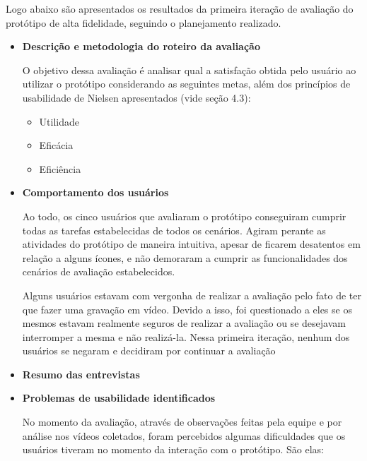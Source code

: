      Logo abaixo são apresentados os resultados da primeira iteração de avaliação do protótipo de alta fidelidade,
      seguindo o planejamento realizado.
      
      \begin{itemize}
       \item \textbf{Descrição e metodologia do roteiro da avaliação}
       
       \subitem O objetivo dessa avaliação é analisar qual a satisfação obtida pelo usuário ao utilizar o protótipo 
        considerando as seguintes metas, além dos princípios de usabilidade de Nielsen apresentados (vide seção 4.3):
       
	\begin{itemize}
	  \item Utilidade
	  \item Eficácia
	  \item Eficiência
	\end{itemize}
       
       \item \textbf{Comportamento dos usuários}
       
	  \subitem Ao todo, os cinco usuários que avaliaram o protótipo conseguiram cumprir todas as tarefas estabelecidas 
	  de todos os cenários. Agiram perante as atividades do protótipo de maneira intuitiva, apesar de ficarem 
	  desatentos em relação a alguns ícones, e não demoraram a cumprir as funcionalidades dos cenários de avaliação 
	  estabelecidos. 
	  
	  \subitem Alguns usuários estavam com vergonha de realizar a avaliação pelo fato de ter que fazer uma gravação em vídeo. 
	  Devido a isso, foi questionado a eles se os mesmos estavam realmente seguros de realizar a avaliação ou se desejavam 
	  interromper a mesma e não realizá-la. Nessa primeira iteração, nenhum dos usuários se negaram e decidiram por 
	  continuar a avaliação
       
       \item \textbf{Resumo das entrevistas}
       
	  \subitem 
	        
       \item \textbf{Problemas de usabilidade identificados}
       
	  \subitem No momento da avaliação, através de observações feitas pela equipe e por análise nos vídeos coletados,
	  foram percebidos algumas dificuldades que os usuários tiveram no momento da interação com o protótipo. São elas:
	  

\end{itemize}
